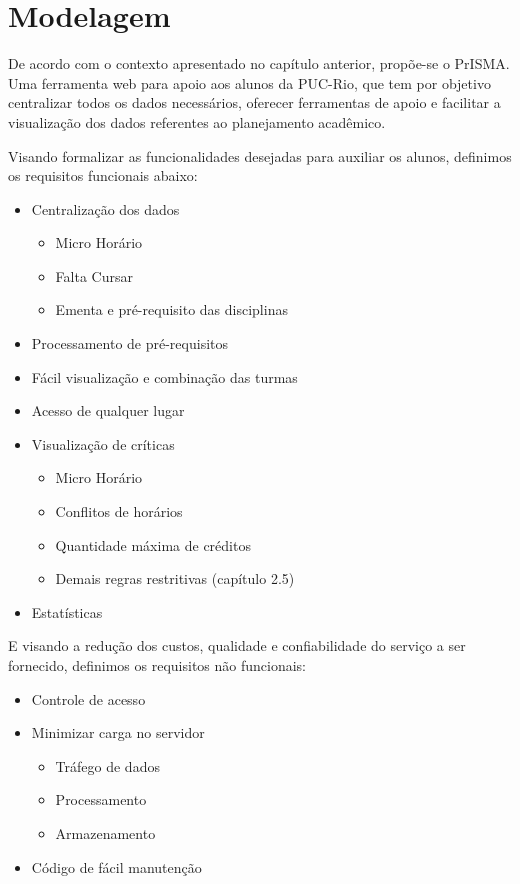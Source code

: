 \documentclass[graduacao,brazil]{ThesisPUC}
\begin{document}
\chapter{Modelagem}

De acordo com o contexto apresentado no capítulo anterior, propõe-se o PrISMA. Uma ferramenta web para apoio aos alunos da PUC-Rio, que tem por objetivo centralizar todos os dados necessários, oferecer ferramentas de apoio e facilitar a visualização dos dados referentes ao planejamento acadêmico. 

Visando formalizar as funcionalidades desejadas para auxiliar os alunos, definimos os requisitos funcionais abaixo:

\begin{itemize}
	\item Centralização dos dados
	\begin{itemize}
		\item Micro Horário 
		\item Falta Cursar 
		\item Ementa e pré-requisito das disciplinas 
	\end{itemize}
	\item Processamento de pré-requisitos 
	\item Fácil visualização e combinação das turmas 
	\item Acesso de qualquer lugar 
	\item Visualização de críticas 
	\begin{itemize}
		\item Micro Horário 
		\item Conflitos de horários 
		\item Quantidade máxima de créditos 
		\item Demais regras restritivas (capítulo 2.5) 
	\end{itemize}
	\item Estatísticas
\end{itemize}

E visando a redução dos custos, qualidade e confiabilidade do serviço a ser fornecido, definimos os requisitos não funcionais:


\begin{itemize}
	\item Controle de acesso 
	\item Minimizar carga no servidor 
	\begin{itemize}
		\item Tráfego de dados 
		\item Processamento 
		\item Armazenamento 
	\end{itemize}
	\item Código de fácil manutenção
\end{itemize}
\end{document}
